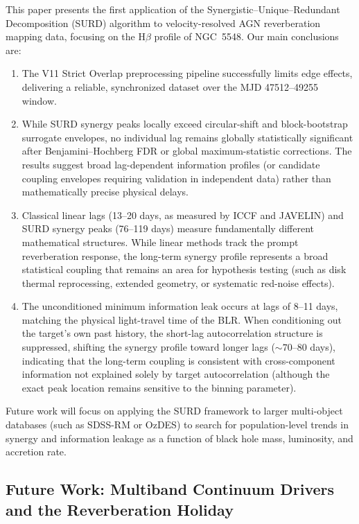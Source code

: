 \documentclass[12pt, a4paper]{article}
\begin{document}
This paper presents the first application of the Synergistic–Unique–Redundant Decomposition (SURD) algorithm to velocity-resolved AGN reverberation mapping data, focusing on the H\(\beta\) profile of NGC~5548. Our main conclusions are:
\begin{enumerate}
\item The V11 Strict Overlap preprocessing pipeline successfully limits edge effects, delivering a reliable, synchronized dataset over the MJD 47512--49255 window.
\item While SURD synergy peaks locally exceed circular-shift and block-bootstrap surrogate envelopes, no individual lag remains globally statistically significant after Benjamini–Hochberg FDR or global maximum-statistic corrections. The results suggest broad lag-dependent information profiles (or candidate coupling envelopes requiring validation in independent data) rather than mathematically precise physical delays.
\item Classical linear lags (13--20 days, as measured by ICCF and JAVELIN) and SURD synergy peaks (76--119 days) measure fundamentally different mathematical structures. While linear methods track the prompt reverberation response, the long-term synergy profile represents a broad statistical coupling that remains an area for hypothesis testing (such as disk thermal reprocessing, extended geometry, or systematic red-noise effects).
\item The unconditioned minimum information leak occurs at lags of 8--11 days, matching the physical light-travel time of the BLR. When conditioning out the target's own past history, the short-lag autocorrelation structure is suppressed, shifting the synergy profile toward longer lags ($\sim 70$--80 days), indicating that the long-term coupling is consistent with cross-component information not explained solely by target autocorrelation (although the exact peak location remains sensitive to the binning parameter).
\end{enumerate}

Future work will focus on applying the SURD framework to larger multi-object databases (such as SDSS-RM or OzDES) to search for population-level trends in synergy and information leakage as a function of black hole mass, luminosity, and accretion rate.

\subsection{Future Work: Multiband Continuum Drivers and the Reverberation Holiday}
\label{sec:future_multiband}
\end{document}

